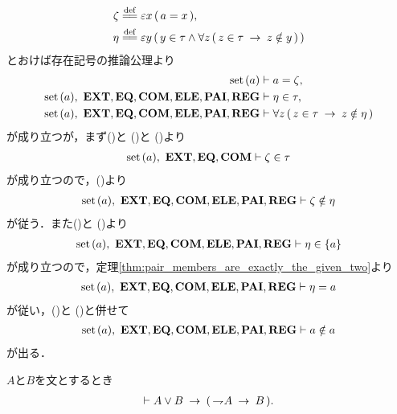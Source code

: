 \begin{sketch}
\begin{align}
			\zeta &\defeq \varepsilon x\, (\, a = x\, ), \\
			\eta &\defeq \varepsilon y\, (\, y \in \tau \wedge \forall z\, (\, 
			z \in \tau \rarrow z \notin y\, )\, )
		\end{align}
		とおけば存在記号の推論公理より
		\begin{align}
			\operatorname*{set}\hspace{0.15em}(a) &\vdash a = \zeta, \label{fom:no_class_contains_itself_4} \\
			\operatorname*{set}\hspace{0.15em}(a),\ \mbox{{\bf EXT}},\mbox{{\bf EQ}},\mbox{\bf COM},\mbox{{\bf ELE}},\mbox{{\bf PAI}},\mbox{{\bf REG}} &\vdash 
			\eta \in \tau, \label{fom:no_class_contains_itself_5} \\
			\operatorname*{set}\hspace{0.15em}(a),\ \mbox{{\bf EXT}},\mbox{{\bf EQ}},\mbox{\bf COM},\mbox{{\bf ELE}},\mbox{{\bf PAI}},\mbox{{\bf REG}} &\vdash 
			\forall z\, (\, z \in \tau \hspace{0.25em}\rightarrow\hspace{0.25em} z \notin \eta\, )
			\label{fom:no_class_contains_itself_6}
		\end{align}
		が成り立つが，まず()と
		()と
		()より
		\begin{align}
			\operatorname*{set}\hspace{0.15em}(a),\ \mbox{{\bf EXT}},\mbox{{\bf EQ}},\mbox{\bf COM} \vdash \zeta \in \tau
		\end{align}
		が成り立つので，()より
		\begin{align}
			\operatorname*{set}\hspace{0.15em}(a),\ \mbox{{\bf EXT}},\mbox{{\bf EQ}},\mbox{\bf COM},\mbox{{\bf ELE}},\mbox{{\bf PAI}},\mbox{{\bf REG}} \vdash 
			\zeta \notin \eta
			\label{fom:no_class_contains_itself_7}
		\end{align}
		が従う．また()と
		()より
		\begin{align}
			\operatorname*{set}\hspace{0.15em}(a),\ \mbox{{\bf EXT}},\mbox{{\bf EQ}},\mbox{\bf COM},\mbox{{\bf ELE}},\mbox{{\bf PAI}},\mbox{{\bf REG}} \vdash \eta \in \{a\}
		\end{align}
		が成り立つので，定理\ref{thm:pair_members_are_exactly_the_given_two}より
		\begin{align}
			\operatorname*{set}\hspace{0.15em}(a),\ \mbox{{\bf EXT}},\mbox{{\bf EQ}},\mbox{\bf COM},\mbox{{\bf ELE}},\mbox{{\bf PAI}},\mbox{{\bf REG}} \vdash \eta = a
		\end{align}
		が従い，()と
		()と併せて
		\begin{align}
			\operatorname*{set}\hspace{0.15em}(a),\ \mbox{{\bf EXT}},\mbox{{\bf EQ}},\mbox{\bf COM},\mbox{{\bf ELE}},\mbox{{\bf PAI}},\mbox{{\bf REG}} \vdash a \notin a
		\end{align}
		が出る．
		\QED
	\end{sketch}
	
	\begin{screen}
		\begin{logicalthm}[選言三段論法]
		\label{logicalthm:disjunctive_syllogism}
			$A$と$B$を文とするとき
			\begin{align}
				\vdash A \vee B \hspace{0.25em}\rightarrow\hspace{0.25em} (\, \rightharpoondown\hspace{-0.25em} A \hspace{0.25em}\rightarrow\hspace{0.25em} B\, ).
			\end{align}
		\end{logicalthm}
	\end{screen}
	
